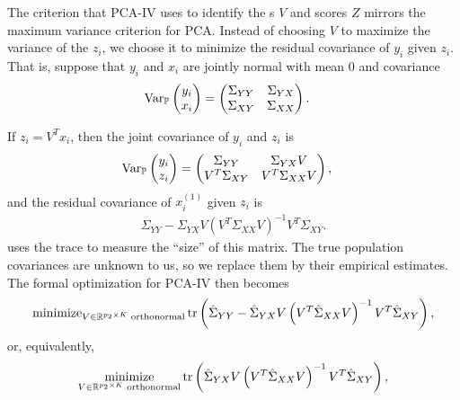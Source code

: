 \documentclass[14pt]{extarticle}
\begin{document}
The criterion that PCA-IV uses to identify the s $V$ and scores $Z$
mirrors the maximum variance criterion for PCA. Instead of choosing $V$ to
maximize the variance of the $z_{i}$, we choose it to minimize the residual
covariance of $y_{i}$ given $z_{i}$. That is, suppose that $y_{i}$ and $x_{i}$
are jointly normal with mean 0 and covariance
\begin{align*}
\mathrm{Var}_{\mathbb{P}}\begin{pmatrix}y_{i} \\ x_{i}\end{pmatrix} &=
\begin{pmatrix}
  \Sigma_{YY} & \Sigma_{YX} \\
  \Sigma_{XY} & \Sigma_{XX}
\end{pmatrix}.
\end{align*}

If $z_{i} = V^{T}x_{i}$, then the joint covariance of $y_{i}$ and $z_{i}$ is
\begin{align*}
  \mathrm{Var}_{\mathbb{P}}\begin{pmatrix} y_{i} \\ z_{i} \end{pmatrix} &=
  \begin{pmatrix}
    \Sigma_{YY} & \Sigma_{YX}V \\
    V^{T}\Sigma_{XY} & V^{T}\Sigma_{XX}V
  \end{pmatrix},
\end{align*}
and the residual covariance of $x_{i}^{(1)}$ given $z_{i}$ is
\begin{align}
  \Sigma_{YY} -
  \Sigma_{YX}V\left(V^{T}\Sigma_{XX}V\right)^{-1}V^{T}\Sigma_{XY}. \label{eq:pca_iv_resid_cov}
\end{align}
\citep{rao1964use} uses the trace to measure the ``size'' of this matrix. The
true population covariances are unknown to us, so we replace them by their
empirical estimates. The formal optimization for PCA-IV then becomes
\begin{align}
  \text{minimize}_{V\in \mathbb{R}^{p_{2} \times K} \text{ orthonormal}}
  \mathop\mathrm{tr}\left(\hat{\Sigma}_{YY} -
  \hat{\Sigma}_{YX}V\left(V^{T}\hat{\Sigma}_{XX}V\right)^{-1}V^{T}\hat{\Sigma}_{XY}\right) \label{eq:pca_iv_obj},
\end{align}
or, equivalently,
\begin{align}
  \mathop\mathrm{minimize}_{V\in \mathbb{R}^{p_{2} \times K} \text{ orthonormal}}
  \mathop\mathrm{tr}\left(\hat{\Sigma}_{YX}V\left(V^{T}\hat{\Sigma}_{XX}V\right)^{-1}V^{T}\hat{\Sigma}_{XY}\right) \label{eq:pca_iv_obj_2},
\end{align}
\end{document}
